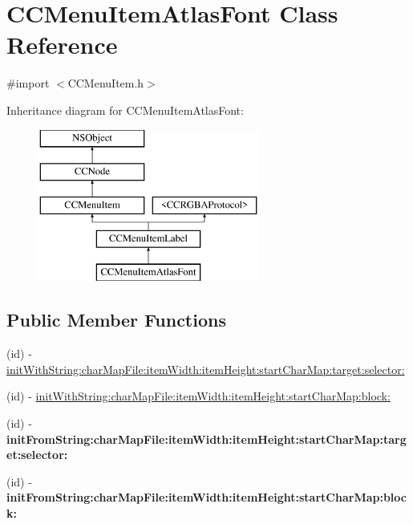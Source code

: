 \hypertarget{class_c_c_menu_item_atlas_font}{\section{C\-C\-Menu\-Item\-Atlas\-Font Class Reference}
\label{class_c_c_menu_item_atlas_font}
}


{\ttfamily \#import $<$C\-C\-Menu\-Item.\-h$>$}

Inheritance diagram for C\-C\-Menu\-Item\-Atlas\-Font\-:\begin{figure}[H]
\begin{center}
\leavevmode
\includegraphics[height=5.000000cm]{class_c_c_menu_item_atlas_font}
\end{center}
\end{figure}
\subsection*{Public Member Functions}
\begin{DoxyCompactItemize}
\item 
(id) -\/ \hyperlink{class_c_c_menu_item_atlas_font_a636a31717adc3cde6775edec00c5c69b}{init\-With\-String\-:char\-Map\-File\-:item\-Width\-:item\-Height\-:start\-Char\-Map\-:target\-:selector\-:}
\item 
(id) -\/ \hyperlink{class_c_c_menu_item_atlas_font_aa7de1e5b9e9cb4584c42aebe1502dc88}{init\-With\-String\-:char\-Map\-File\-:item\-Width\-:item\-Height\-:start\-Char\-Map\-:block\-:}
\item 
\hypertarget{class_c_c_menu_item_atlas_font_ae5b544ebe259a76571350854b3e8f101}{(id) -\/ {\bfseries init\-From\-String\-:char\-Map\-File\-:item\-Width\-:item\-Height\-:start\-Char\-Map\-:target\-:selector\-:}}\label{class_c_c_menu_item_atlas_font_ae5b544ebe259a76571350854b3e8f101}

\item 
\hypertarget{class_c_c_menu_item_atlas_font_a31f44bb1c2dbe629581e22231e6a08c4}{(id) -\/ {\bfseries init\-From\-String\-:char\-Map\-File\-:item\-Width\-:item\-Height\-:start\-Char\-Map\-:block\-:}}\label{class_c_c_menu_item_atlas_font_a31f44bb1c2dbe629581e22231e6a08c4}

\end{DoxyCompactItemize}
